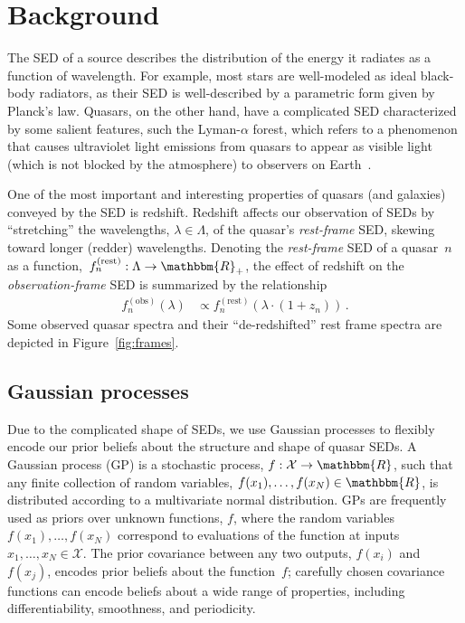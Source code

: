 \documentclass{article}
\newcommand{\R}{\mathbbm{R}}
\newcommand{\mcX}{\mathcal{X}}
\begin{document}
\section{Background}
\label{sec:background}
The SED of a source describes the distribution of the energy it radiates as a function of wavelength.  
For example, most stars are well-modeled as ideal black-body radiators, as their SED is well-described by a parametric form given by Planck's law. 
Quasars, on the other hand, have a complicated SED characterized by some salient features, such the Lyman-$\alpha$ forest, which refers to a phenomenon that causes ultraviolet light emissions from quasars to appear as visible light (which is not blocked by the atmosphere) to observers on Earth~\cite{weinberg2003lymanalpha}.

One of the most important and interesting properties of quasars (and galaxies) conveyed by the SED is redshift. 
Redshift affects our observation of SEDs by ``stretching'' the wavelengths, ${\lambda \in \Lambda}$, of the quasar's \emph{rest-frame} SED, skewing toward longer (redder) wavelengths.
Denoting the \emph{rest-frame} SED of a quasar~$n$ as a function,~${f_n^{(\text{rest})} : \Lambda \rightarrow \R_+}$, the effect of redshift on the \emph{observation-frame} SED is summarized by the relationship 
\begin{align}
  f_n^{(\text{obs})}(\lambda) &\propto f_n^{(\text{rest})}(\lambda \cdot (1 + z_n)) \, .
\end{align}
Some observed quasar spectra and their ``de-redshifted'' rest frame spectra are depicted in Figure~\ref{fig:frames}.

\subsection{Gaussian processes}
Due to the complicated shape of SEDs, we use Gaussian processes to flexibly encode our prior beliefs about the structure and shape of quasar SEDs. 
A Gaussian process (GP) is a stochastic process, ${f: \mathcal{X} \rightarrow \R}$, such that any finite collection of random variables, ${f(x_1),\dots, f(x_N) \in \R}$, is distributed according to a multivariate normal distribution.  
GPs are frequently used as priors over unknown functions, $f$, where the random variables $f(x_1), \dots, f(x_N)$ correspond to evaluations of the function at inputs ${x_1, \dots, x_N \in \mcX}$.  
The prior covariance between any two outputs, $f(x_i)$ and $f(x_j)$, encodes prior beliefs about the function~$f$; carefully chosen covariance functions can encode beliefs about a wide range of properties, including differentiability, smoothness, and periodicity.  
\end{document}
